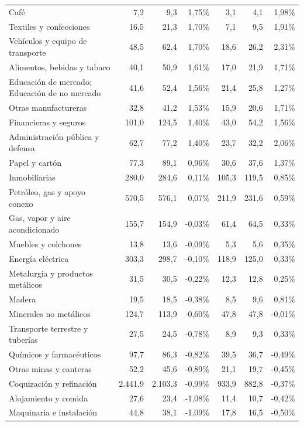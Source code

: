 \begin{longtable}{p{}rrrrrr}
Café & 7,2 & 9,3 & 1,75\% & 3,1 & 4,1 & 1,98\% \\
Textiles y confecciones & 16,5 & 21,3 & 1,70\% & 7,1 & 9,5 & 1,91\% \\
Vehículos y equipo de transporte & 48,5 & 62,4 & 1,70\% & 18,6 & 26,2 & 2,31\% \\
Alimentos, bebidas y tabaco & 40,1 & 50,9 & 1,61\% & 17,0 & 21,9 & 1,71\% \\
Educación de mercado; Educación de no mercado & 41,6 & 52,4 & 1,56\% & 21,4 & 25,8 & 1,27\% \\
Otras manufactureras & 32,8 & 41,2 & 1,53\% & 15,9 & 20,6 & 1,71\% \\
Financieras y seguros & 101,0 & 124,5 & 1,40\% & 43,0 & 54,2 & 1,56\% \\
Administración pública y defensa & 62,7 & 77,2 & 1,40\% & 23,7 & 32,2 & 2,06\% \\
Papel y cartón & 77,3 & 89,1 & 0,96\% & 30,6 & 37,6 & 1,37\% \\
Inmobiliarias & 280,0 & 284,6 & 0,11\% & 105,3 & 119,5 & 0,85\% \\
Petróleo, gas y apoyo conexo & 570,5 & 576,1 & 0,07\% & 211,9 & 231,6 & 0,59\% \\
Gas, vapor y aire acondicionado & 155,7 & 154,9 & -0,03\% & 61,4 & 64,5 & 0,33\% \\
Muebles y colchones & 13,8 & 13,6 & -0,09\% & 5,3 & 5,6 & 0,35\% \\
Energía eléctrica & 303,3 & 298,7 & -0,10\% & 118,9 & 125,0 & 0,33\% \\
Metalurgia y productos metálicos & 31,5 & 30,5 & -0,22\% & 12,3 & 12,8 & 0,25\% \\
Madera & 19,5 & 18,5 & -0,38\% & 8,5 & 9,6 & 0,81\% \\
Minerales no metálicos & 124,7 & 113,9 & -0,60\% & 47,8 & 47,8 & -0,01\% \\
Transporte terrestre y tuberías & 27,5 & 24,5 & -0,78\% & 8,9 & 9,3 & 0,33\% \\
Químicos y farmacéuticos & 97,7 & 86,3 & -0,82\% & 39,5 & 36,7 & -0,49\% \\
Otras minas y canteras & 52,2 & 45,6 & -0,89\% & 21,1 & 19,7 & -0,45\% \\
Coquización y refinación & 2.441,9 & 2.103,3 & -0,99\% & 933,9 & 882,8 & -0,37\% \\
Alojamiento y comida & 27,6 & 23,4 & -1,08\% & 11,4 & 10,7 & -0,42\% \\
Maquinaria e instalación & 44,8 & 38,1 & -1,09\% & 17,8 & 16,5 & -0,50\% \\

\end{longtable}
